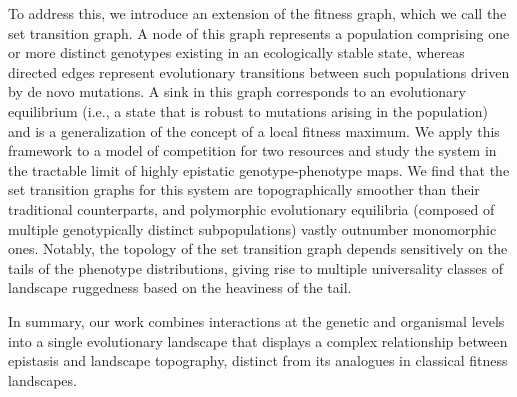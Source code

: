 \documentclass[12pt,a4paper]{article}
\begin{document}
 To address this, we introduce an extension of the fitness graph, which we call the set transition graph. A node of this graph represents a population comprising one or more distinct genotypes existing in an ecologically stable state, whereas directed edges represent evolutionary transitions between such populations driven by de novo mutations. A sink in this graph corresponds to an evolutionary equilibrium (i.e., a state that is robust to mutations arising in the population) and is a generalization of the concept of a local fitness maximum. We apply this framework to a model of competition for two resources and study the system in the tractable limit of highly epistatic genotype-phenotype maps. We find that the set transition graphs for this system are topographically smoother than their traditional counterparts, and polymorphic evolutionary equilibria (composed of multiple genotypically distinct subpopulations) vastly outnumber monomorphic ones. Notably, the topology of the set transition graph depends sensitively on the tails of the phenotype distributions, giving rise to multiple universality classes of landscape ruggedness based on the heaviness of the tail. 

 In summary, our work combines interactions at the genetic and organismal levels into a single evolutionary landscape that displays a complex relationship between epistasis and landscape topography, distinct from its analogues in classical fitness landscapes.  

\bigskip\bigskip
\end{document}
